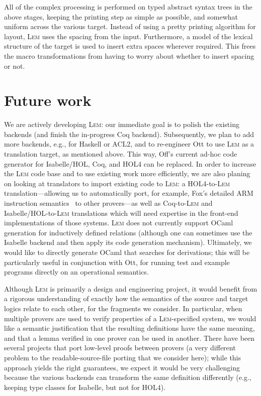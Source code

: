 \documentclass[a4paper]{llncs}
\newcommand{\myparagraph}[1]{\vspace{0.5\baselineskip}\par\noindent{\normalsize\bfseries{#1}}\quad}
\newcommand{\Lem}{\textsc{Lem}}
\begin{document}
\myparagraph{Printing}
All of the complex processing is performed on typed abstract syntax trees in the
above stages, keeping the printing step as simple as possible, and somewhat
uniform across the various target.  Instead of using a pretty printing algorithm
for layout, \Lem{} uses the spacing from the input.  Furthermore, a model
of the lexical structure of the target is used to insert extra spaces wherever
required.  This frees the macro transformations from having to worry about
whether to insert spacing or not.


\section{Future work}

We are actively developing \Lem{}: our immediate goal is to polish the existing
backends (and finish the in-progress Coq backend).  Subsequently, we plan to add
more backends, e.g., for Haskell or ACL2, and to re-engineer Ott to use \Lem{}
as a translation target, as mentioned above. This way, Off's current ad-hoc code
generator for Isabelle/HOL, Coq, and HOL4 can be replaced.
%
In order to increase the \Lem{} code base and to use existing work more
efficiently, we are also planing on looking at translators to import existing
code to \Lem{}: a HOL4-to-\Lem{} translation---allowing us to automatically
port, for example, Fox's detailed ARM instruction semantics~\cite{anthonyARM} to
other provers---as well as Coq-to-\Lem{} and Isabelle/HOL-to-\Lem{} translations
which will need expertise in the front-end implementations of those systems.
%
\Lem{} does not currently support OCaml generation for inductively defined
relations (although one can sometimes use the Isabelle backend and then apply
its code generation mechanism).  Ultimately, we would like to directly generate
OCaml that searches for derivations; this will be particularly useful in
conjunction with Ott, for running test and example programs directly on an
operational semantics.

Although \Lem{} is primarily a design and engineering project, it would benefit
from a rigorous understanding of exactly how the semantics of the source and
target logics relate to each other, for the fragments we consider.  In
particular, when multiple provers are used to verify properties of a
\Lem{}-specified system, we would like a semantic justification that the
resulting definitions have the same meaning, and that a lemma verified in one
prover can be used in another.
%
There have been several projects that port low-level proofs between provers (a
very different problem to the readable-source-file porting that we consider
here); while this approach yields the right guarantees, we expect it would be
very challenging because the various backends can transform the same definition
differently (e.g., keeping type classes for Isabelle, but not for HOL4).







%
{

}
\end{document}
